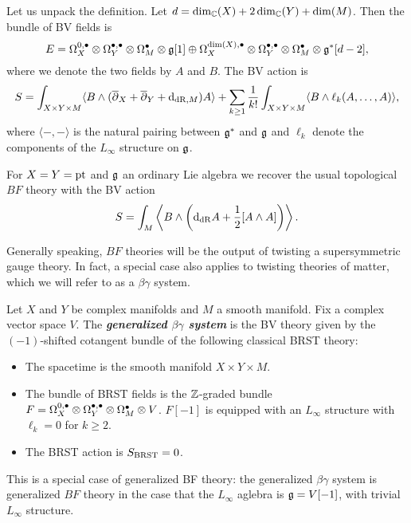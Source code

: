 \documentclass[10pt, oneside]{article}
\newcommand{\defterm}[1]{\textbf{\emph{#1}}}
\begin{document}
Let us unpack the definition. Let $d = \dim_\mathbb C(X) + 2\dim_\mathbb C(Y) + \dim(M)$. Then the bundle of BV fields is
\[E = \Omega^{0,\bullet}_X \otimes \Omega^{\bullet,\bullet}_Y \otimes \Omega^\bullet_M \otimes \mathfrak g[1]\oplus \Omega^{\dim(X),\bullet}_X \otimes \Omega^{\bullet,\bullet}_Y \otimes \Omega^\bullet_M\otimes \mathfrak g^*[d-2],\]
where we denote the two fields by $A$ and $B$. The BV action is
\[S = \int_{X\times Y\times M} \langle B\wedge (\overline{\partial}_X + \overline{\partial}_Y + {\rm d}_{\mathrm{dR}, M}) A\rangle + \sum_{k\geq 1}\frac{1}{k!} \int_{X\times Y\times M} \langle B\wedge \ell_k(A, \dots, A)\rangle,\]
where $\langle -, -\rangle$ is the natural pairing between $\mathfrak g^*$ and $\mathfrak g$ and $\ell_k$ denote the components of the $L_\infty$ structure on $\mathfrak g$.

\begin{example}
For $X=Y=\operatorname{pt}$ and $\mathfrak g$ an ordinary Lie algebra we recover the usual topological $BF$ theory with the BV action
\[S = \int_M \left\langle B\wedge \left({\rm d}_{\mathrm{dR}} A+ \frac{1}{2}[A\wedge A]\right)\right\rangle.\]
\end{example}

Generally speaking, $BF$ theories will be the output of twisting a supersymmetric gauge theory. 
In fact, a special case also applies to twisting theories of matter, which we will refer to as a $\beta\gamma$ system. 

\begin{definition}
Let $X$ and $Y$ be complex manifolds and $M$ a smooth manifold. Fix a complex vector space $V$. The \defterm{generalized $\beta\gamma$ system} is the BV theory given by the $(-1)$-shifted cotangent bundle of the following classical BRST theory:
\begin{itemize}
\item The spacetime is the smooth manifold $X\times Y\times M$.

\item The bundle of BRST fields is the $\mathbb Z$-graded bundle $F = \Omega^{0,\bullet}_X \otimes \Omega^{\bullet,\bullet}_Y \otimes \Omega^\bullet_M \otimes V$. $F[-1]$ is equipped with an $L_\infty$ structure with $\ell_{k} = 0$ for $k \geq 2$. 

\item The BRST action is $S_{\mathrm{BRST}} = 0$.
\end{itemize}
\end{definition}

\begin{rmk}
This is a special case of generalized BF theory:
the generalized $\beta\gamma$ system is generalized $BF$ theory in the case that the $L_\infty$ aglebra is $\mathfrak g = V[-1]$, with trivial $L_\infty$ structure. 
\end{rmk}
\end{document}
